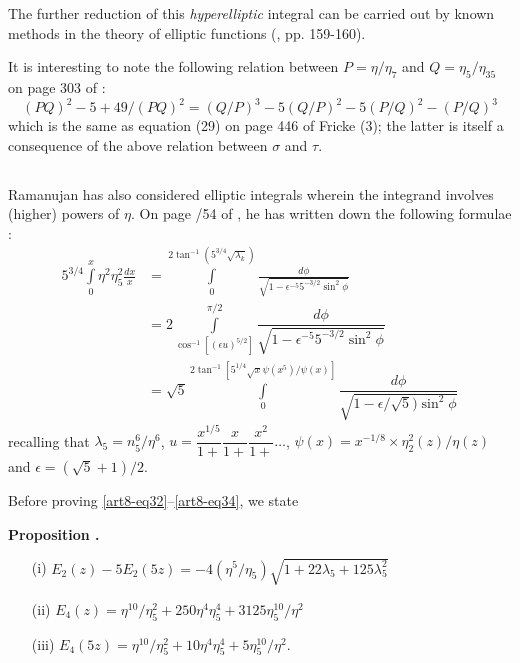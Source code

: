 \begin{remarks*}
The further reduction of this {\em hyperelliptic} integral can be carried out by known methods in the theory of elliptic functions (\cite{art8-key4}, pp. 159-160).
\end{remarks*}

It is interesting to note the following relation between $P=\eta/\eta_{7}$ and $Q=\eta_{5}/\eta_{35}$ on page 303 of \cite{art8-key10} :
$$
(PQ)^{2}-5+49/(PQ)^{2}=(Q/P)^{3}-5(Q/P)^{2}-5(P/Q)^{2}-(P/Q)^{3}
$$
which is the same as equation (29) on page 446 of Fricke (3); the latter is itself a consequence of the above relation between $\sigma$ and $\tau$.

\subsection{}\label{art8-sec3.4}
Ramanujan has also considered elliptic integrals wherein the integrand involves (higher) powers of $\eta$. On page /54 of \cite{art8-key11}, he has written down the following formulae :
\begin{align}
5^{3/4}\int\limits^{x}_{0}\eta^{2}\eta^{2}_{5}\frac{dx}{x} &= \int\limits^{2\tan^{-1}(5^{3/4}\sqrt{\lambda_{k}})}_{0} \frac{d\phi}{\sqrt{1-\epsilon^{-5}5^{-3/2}\sin^{2}\phi}}\label{art8-eq32}\\[5pt]
&= 2 \int\limits^{\pi/2}_{\cos^{-1}[(\epsilon u)^{5/2}]}\dfrac{d\phi}{\sqrt{1-\epsilon^{-5}5^{-3/2}\sin^{2}\phi}}\label{art8-eq33}\\[5pt]
&= \sqrt{5}\int\limits^{2\tan^{-1}[5^{1/4}\sqrt{x}\psi(x^{5})/\psi(x)]}_{0}\dfrac{d\phi}{\sqrt{1-\epsilon/\sqrt{5})\sin^{2}\phi}}\label{art8-eq34}
\end{align}
recalling that $\lambda_{5}=n^{6}_{5}/\eta^{6}$, $u=\dfrac{x^{1/5}}{1+}\dfrac{x}{1+}\dfrac{x^{2}}{1+}\ldots$, $\psi(x)=x^{-1/8}\times \eta^{2}_{2}(z)/\eta(z)$ and $\epsilon=(\sqrt{5}+1)/2$.

Before proving \eqref{art8-eq32}--\eqref{art8-eq34}, we state

\medskip
\noindent
{\bf Proposition .\label{art8-prop3}}
\begin{itemize}
\item[(i)] $E_{2}(z)-5E_{2}(5z)=-4(\eta^{5}/\eta_{5})\sqrt{1+22\lambda_{5}+125\lambda^{2}_{5}}$

\item[(ii)] $E_{4}(z)=\eta^{10}/\eta^{2}_{5}+250\eta^{4}\eta^{4}_{5}+3125\eta^{10}_{5}/\eta^{2}$

\item[(iii)] $E_{4}(5z)=\eta^{10}/\eta^{2}_{5}+10\eta^{4}\eta^{4}_{5}+5\eta^{10}_{5}/\eta^{2}$.
\end{itemize}

